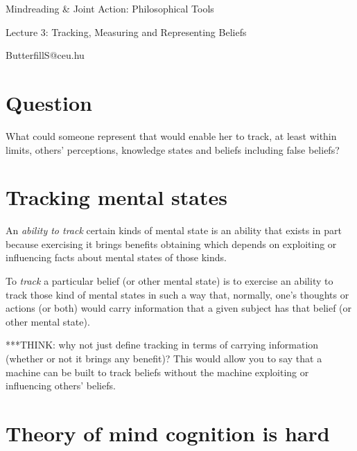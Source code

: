\documentclass[11pt]{extarticle}
\date{}
\begin{document}
\begin{multicols}{3}

\setlength\footnotesep{1em}









\begin{center}
{\Large
Mindreading \& Joint Action: Philosophical Tools}

Lecture 3: Tracking, Measuring and Representing Beliefs


ButterfillS@ceu.hu
\end{center}

\section{Question}
What could someone represent that would enable her to track, at least within limits, others' perceptions, knowledge states and beliefs including false beliefs? 




\section{Tracking mental states}

An \emph{ability to track} certain kinds of mental state is an ability that exists in part because exercising it brings benefits obtaining which depends on exploiting or influencing facts about mental states of those kinds.  

To \textit{track} a particular belief (or other mental state) is to exercise an ability to track those kind of mental states in such a way that, normally, one's thoughts or actions (or both) would carry information that a given subject has that belief (or other mental state).

***THINK: why not just define tracking in terms of carrying information (whether or not it brings any benefit)?  This would allow you to say that a machine can be built to track beliefs without the machine exploiting or influencing others' beliefs.


\section{Theory of mind cognition is hard}


\end{multicols}
\end{document}
